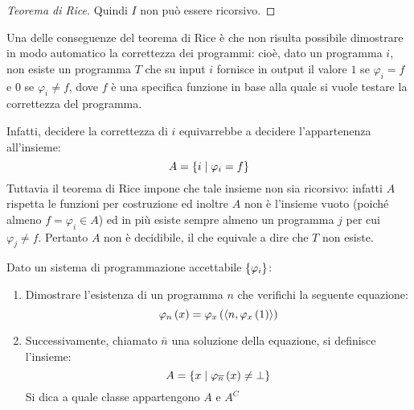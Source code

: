 \documentclass{lectures}
\begin{document}
\begin{multicols}{2}
\begin{proof}[Teorema di Rice]
        Quindi \(I\) non può essere ricorsivo.
    \end{proof}
    \begin{observation}
        Una delle conseguenze del teorema di Rice è che non risulta possibile dimostrare in modo automatico la correttezza dei programmi: cioè, dato un programma \(i\), non esiste un programma \(T\) che su input \(i\) fornisce in output il valore \(1\) se \(\varphi_i=f\) e \(0\) se \(\varphi_i \neq f\), dove \(f\) è una specifica funzione in base alla quale si vuole testare la correttezza del programma. 
        
        Infatti, decidere la correttezza di \(i\) equivarrebbe a decidere l'appartenenza all'insieme:
        \[A = \left\{i \mid \varphi_i = f\right\}\]
        Tuttavia il teorema di Rice impone che tale insieme non sia ricorsivo: infatti \(A\) rispetta le funzioni per costruzione ed inoltre \(A\) non è l'insieme vuoto (poiché almeno \(f = \varphi_i \in A\)) ed in più esiste sempre almeno un programma \(j\) per cui \(\varphi_j \neq f\). Pertanto \(A\) non è decidibile, il che equivale a dire che \(T\) non esiste.
    \end{observation}
\end{multicols}
\clearpage
\begin{problem}
    Dato un sistema di programmazione accettabile \(\left\{\varphi_i\right\}\):
    \begin{enumerate}
        \item Dimostrare l'esistenza di un programma \(n\) che verifichi la seguente equazione:
        \[
            \varphi_n\left(x\right) = \varphi_x\left(\left\langle n, \varphi_x\left(1\right)\right\rangle\right)
        \]
        \item Successivamente, chiamato \(\bar{n}\) una soluzione della equazione, si definisce l'insieme:
        \[
            A = \left\{x \mid \varphi_{\overline{n}}\left(x\right) \neq \bot\right\}
        \]
        Si dica a quale classe appartengono \(A\) e \(A^C\)
    \end{enumerate}
\end{problem}
\end{document}
